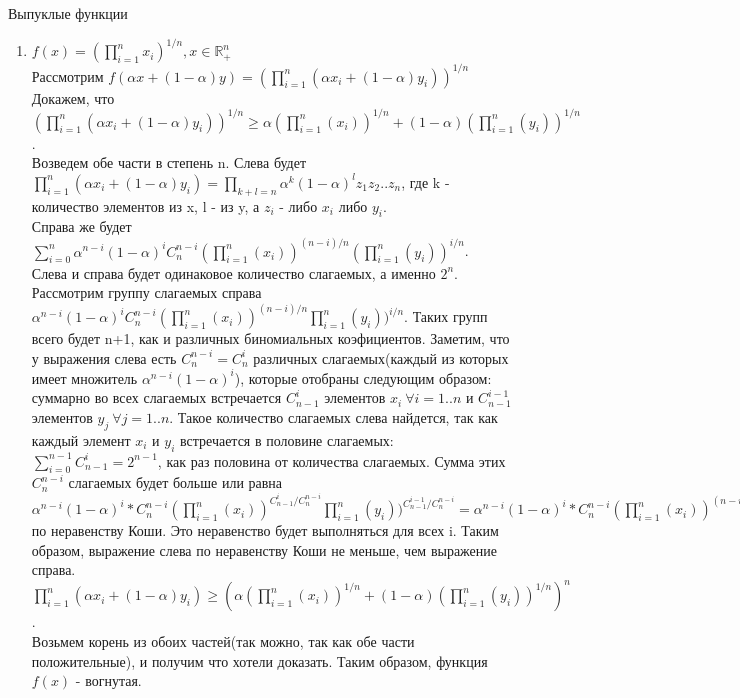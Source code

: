 \documentclass[12pt]{extreport}
\theoremstyle{definiton}
\theoremstyle{definition}
\theoremstyle{definition}
\let\geq\geqslant
\begin{document}
	\PR[] Выпуклые функции
    
    \begin{enumerate} 
        \item $f(x)=(\prod_{i=1}^{n}x_i)^{1/n}, x \in \mathbb{R}_+^n$
        \newline
        \\ Рассмотрим $f(\alpha x + (1-\alpha) y) = (\prod_{i=1}^{n}(\alpha x_i + (1-\alpha) y_i))^{1/n}$
        \\ Докажем, что $(\prod_{i=1}^{n}(\alpha x_i + (1-\alpha) y_i))^{1/n} \geq \alpha (\prod_{i=1}^{n}(x_i))^{1/n} + (1-\alpha)(\prod_{i=1}^{n}(y_i))^{1/n}$.
        \\ Возведем обе части в степень n. Слева будет $\prod_{i=1}^{n}(\alpha x_i + (1-\alpha) y_i)=\prod_{k+l=n}\alpha^k(1-\alpha)^lz_1z_2..z_n$, где k - количество элементов из x, l - из y, а $z_i$ - либо $x_i$ либо $y_i$. 
        \\Справа же будет $\sum_{i=0}^n\alpha^{n-i}(1-\alpha)^iC_n^{n-i}(\prod_{i=1}^{n}(x_i))^{(n-i)/n}(\prod_{i=1}^{n}(y_i))^{i/n}$. 
        \\Слева и справа будет одинаковое количество слагаемых, а именно $2^n$. Рассмотрим группу слагаемых справа $\alpha^{n-i}(1-\alpha)^iC_n^{n-i}(\prod_{i=1}^{n}(x_i))^{(n-i)/n}\prod_{i=1}^{n}(y_i))^{i/n}$. Таких групп всего будет n+1, как и различных биномиальных коэфициентов. Заметим, что у выражения слева есть $C_n^{n-i}=C_n^{i}$ различных слагаемых(каждый из которых имеет множитель $\alpha^{n-i}(1-\alpha)^i$), которые отобраны следующим образом: суммарно во всех слагаемых встречается $C_{n-1}^i$ элементов $x_i\ \forall i=1..n$ и $C_{n-1}^{i-1}$ элементов $y_j\ \forall j=1..n$. Такое количество слагаемых слева найдется, так как каждый элемент $x_i$ и $y_i$ встречается в половине слагаемых: $\sum_{i=0}^{n-1}C_{n-1}^i = 2^{n-1}$, как раз половина от количества слагаемых. Сумма этих $C_n^{n-i}$ слагаемых будет больше или равна $\alpha^{n-i}(1-\alpha)^i*C_n^{n-i}(\prod_{i=1}^{n}(x_i))^{C_{n-1}^i/C_n^{n-i}}\prod_{i=1}^{n}(y_i))^{C_{n-1}^{i-1}/C_n^{n-i}}=\alpha^{n-i}(1-\alpha)^i*C_n^{n-i}(\prod_{i=1}^{n}(x_i))^{(n-i)/n}\prod_{i=1}^{n}(y_i))^{i/n}$ по неравенству Коши. Это неравенство будет выполняться для всех i. Таким образом, выражение слева по неравенству Коши не меньше, чем выражение справа. 
        \\$\prod_{i=1}^{n}(\alpha x_i + (1-\alpha) y_i) \geq (\alpha (\prod_{i=1}^{n}(x_i))^{1/n} + (1-\alpha)(\prod_{i=1}^{n}(y_i))^{1/n})^n$.
        \\ Возьмем корень из обоих частей(так можно, так как обе части положительные), и получим что хотели доказать. Таким образом, функция $f(x)$ - вогнутая.

\end{enumerate}
\end{document}
